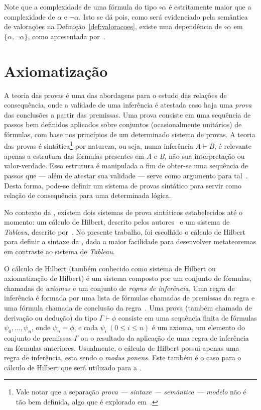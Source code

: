     Note que a complexidade de uma fórmula do tipo $\circ \alpha$ é estritamente maior que a complexidade de $\alpha$ e $\neg \alpha$. Isto se dá pois, como será evidenciado pela semântica de valorações na Definição~\ref{def:valoracoes}, existe uma dependência de $\circ \alpha$ em $\{\alpha, \neg \alpha\}$, como apresentada por~.

\section{Axiomatização}\label{sec:axiomatizacao}

    A teoria das provas é uma das abordagens para o estudo das relações de consequência, onde a validade de uma inferência é atestada caso haja uma \textit{prova} das conclusões a partir das premissas. Uma prova consiste em uma sequência de passos bem definidos aplicados sobre conjuntos (ocasionalmente unitários) de fórmulas, com base nos princípios de um determinado sistema de provas. A teoria das provas é sintática\footnote{Vale notar que a separação \textit{prova {---} sintaxe {---} semântica {---} modelo} não é tão bem definida, algo que é explorado em~.} por natureza, ou seja, numa inferência $A \vdash B$, é relevante apenas a estrutura das fórmulas presentes em \textit{A} e \textit{B}, não sua interpretação ou valor-verdade. Essa estrutura é manipulada a fim de obter-se uma sequência de passos que {---} além de atestar sua validade {---} serve como argumento para tal~\cite{sep-logical-consequence}. Desta forma, pode-se definir um sistema de provas sintático para servir como relação de consequência para uma determinada lógica. 

    No contexto da \lfium{}, existem dois sistemas de prova sintáticos estabelecidos até o momento: um cálculo de Hilbert, descrito pelos autores~ e um sistema de \textit{Tableau}, descrito por~. No presente trabalho, foi escolhido o cálculo de Hilbert para definir a sintaxe da \lfium{}, dada a maior facilidade para desenvolver metateoremas em contraste ao sistema de \textit{Tableau}.

    O cálculo de Hilbert (também conhecido como sistema de Hilbert ou axiomatização de Hilbert) é um sistema composto por um conjunto de fórmulas, chamadas de \textit{axiomas} e um conjunto de \textit{regras de inferência}. Uma regra de inferência é formada por uma lista de fórmulas chamadas de premissas da regra e uma fórmula chamada de conclusão da regra~\cite{Restall1999-RESAIT-4}. Uma prova (também chamada de derivação ou dedução) do tipo $\Gamma \vdash \phi$ consiste em uma sequência finita de fórmulas \(\psi_0, \dots, \psi_n\), onde \(\psi_n = \phi\), e cada  $\psi_i\ (0 \leq i \leq n)$ é um axioma, um elemento do conjunto de premissas $\Gamma$ ou o resultado da aplicação de uma regra de inferência em fórmulas anteriores. Usualmente, o cálculo de Hilbert possui apenas uma regra de inferência, esta sendo o \textit{modus ponens}. Este também é o caso para o cálculo de Hilbert que será utilizado para a \lfium{}.
    
